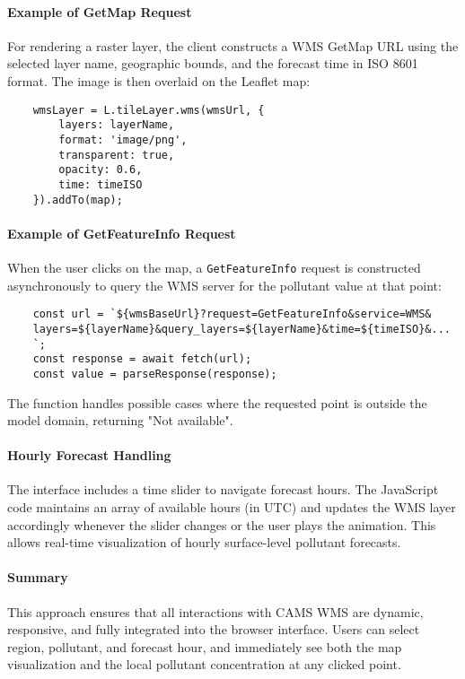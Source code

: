 \paragraph{Example of GetMap Request}
For rendering a raster layer, the client constructs a WMS GetMap URL using the selected layer name, geographic bounds, and the forecast time in ISO 8601 format. The image is then overlaid on the Leaflet map:

\begin{verbatim}
	wmsLayer = L.tileLayer.wms(wmsUrl, {
		layers: layerName,
		format: 'image/png',
		transparent: true,
		opacity: 0.6,
		time: timeISO
	}).addTo(map);
\end{verbatim}

\paragraph{Example of GetFeatureInfo Request}
When the user clicks on the map, a \texttt{GetFeatureInfo} request is constructed asynchronously to query the WMS server for the pollutant value at that point:

\begin{verbatim}
	const url = `${wmsBaseUrl}?request=GetFeatureInfo&service=WMS&
	layers=${layerName}&query_layers=${layerName}&time=${timeISO}&...
	`;
	const response = await fetch(url);
	const value = parseResponse(response);
\end{verbatim}

The function handles possible cases where the requested point is outside the model domain, returning "Not available".

\paragraph{Hourly Forecast Handling}
The interface includes a time slider to navigate forecast hours. The JavaScript code maintains an array of available hours (in UTC) and updates the WMS layer accordingly whenever the slider changes or the user plays the animation. This allows real-time visualization of hourly surface-level pollutant forecasts.

\paragraph{Summary}
This approach ensures that all interactions with CAMS WMS are dynamic, responsive, and fully integrated into the browser interface. Users can select region, pollutant, and forecast hour, and immediately see both the map visualization and the local pollutant concentration at any clicked point.

